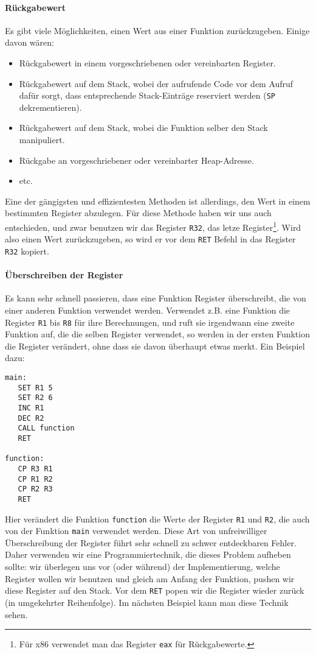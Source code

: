 \paragraph{Rückgabewert}
Es gibt viele Möglichkeiten, einen Wert aus einer Funktion zurückzugeben.
Einige davon wären:
\begin{itemize}
 \item Rückgabewert in einem vorgeschriebenen oder vereinbarten Register.
 \item Rückgabewert auf dem Stack, wobei der aufrufende Code vor dem Aufruf
       dafür sorgt, dass entsprechende Stack-Einträge reserviert werden
       (\texttt{SP} dekrementieren).
 \item Rückgabewert auf dem Stack, wobei die Funktion selber den Stack
       manipuliert.
 \item Rückgabe an vorgeschriebener oder vereinbarter Heap-Adresse.
 \item etc.
\end{itemize}
Eine der gängigsten und effizientesten Methoden ist allerdings, den Wert in
einem bestimmten Register abzulegen. Für diese Methode haben wir uns auch
entschieden, und zwar benutzen wir das Register \texttt{R32}, das letze
Register\footnote{Für x86 verwendet man das Register \texttt{eax} für
Rückgabewerte.}. Wird also einen Wert zurückzugeben, so wird er vor dem
\texttt{RET} Befehl in das Register \texttt{R32} kopiert.


\paragraph{Überschreiben der Register}
Es kann sehr schnell passieren, dass eine Funktion Register überschreibt, die
von einer anderen Funktion verwendet werden. Verwendet z.B. eine Funktion die
Register \texttt{R1} bis \texttt{R8} für ihre Berechnungen, und ruft sie
irgendwann eine zweite Funktion auf, die die selben Register verwendet, so
werden in der ersten Funktion die Register verändert, ohne dass sie davon
überhaupt etwas merkt. Ein Beispiel dazu:
\begin{lstlisting}
main:
   SET R1 5
   SET R2 6
   INC R1
   DEC R2
   CALL function
   RET

function:
   CP R3 R1
   CP R1 R2
   CP R2 R3
   RET
\end{lstlisting}

Hier verändert die Funktion \texttt{function} die Werte der Register \texttt{R1}
und \texttt{R2}, die auch von der Funktion \texttt{main} verwendet werden.
Diese Art von unfreiwilliger Überschreibung der Register führt sehr schnell zu
schwer entdeckbaren Fehler. Daher verwenden wir eine Programmiertechnik, die
dieses Problem aufheben sollte: wir überlegen uns vor (oder während) der
Implementierung, welche Register wollen wir benutzen und gleich am Anfang der
Funktion, pushen wir diese Register auf den Stack. Vor dem \texttt{RET} popen
wir die Register wieder zurück (in umgekehrter Reihenfolge). Im nächsten
Beispiel kann man diese Technik sehen.

